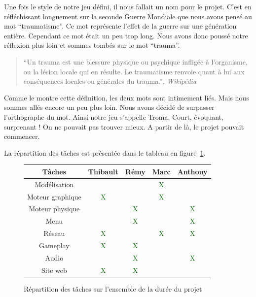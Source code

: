 \documentclass[11pt]{report}
\begin{document}
Une fois le style de notre jeu défini, il nous fallait un nom pour le projet. C'est en réfléchissant longuement sur la seconde Guerre Mondiale que nous avons pensé au mot ``traumatisme''. Ce mot représente l'effet de la guerre sur une génération entière. Cependant ce mot était un peu trop long. Nous avons donc poussé notre réflexion plus loin et sommes tombés sur le mot ``trauma''.

\begin{quote}
``Un trauma est une blessure physique ou psychique infligée à l'organisme, ou la lésion locale qui en résulte. Le traumatisme renvoie quant à lui aux conséquences locales ou générales du trauma.'', \emph{Wikipédia}
\end{quote}

Comme le montre cette définition, les deux mots sont intimement liés. Mais nous sommes allés encore un peu plus loin. Nous avons décidé de surpasser l'orthographe du mot. Ainsi notre jeu s'appelle Troma. Court, évoquant, surprenant ! On ne pouvait pas trouver mieux. A partir de là, le projet pouvait commencer. 

La répartition des tâches est présentée dans le tableau en figure~\ref{tab}.


\begin{figure}[htbp]
\centering
\begin{tabular}{ | c || c | c | c | c | }
\hline Tâches & Thibault & Rémy & Marc & Anthony \\
\hline Modélisation & & & \textcolor{darkgreen}{X} & \\
\hline Moteur graphique & \textcolor{darkgreen}{X} & & \textcolor{darkgreen}{X} & \\
\hline Moteur physique & & \textcolor{darkgreen}{X} & & \textcolor{darkgreen}{X} \\
\hline Menu & & \textcolor{darkgreen}{X} & & \textcolor{darkgreen}{X} \\
\hline Réseau & \textcolor{darkgreen}{X} & & \textcolor{darkgreen}{X} & \textcolor{darkgreen}{X} \\
\hline Gameplay & \textcolor{darkgreen}{X} & \textcolor{darkgreen}{X} & & \\
\hline Audio & & \textcolor{darkgreen}{X} & & \textcolor{darkgreen}{X} \\
\hline Site web & \textcolor{darkgreen}{X} & \textcolor{darkgreen}{X} & & \\
\hline
\end{tabular}
\caption{Répartition des tâches sur l'ensemble de la durée du projet}
\label{tab}
\end{figure}
\end{document}
